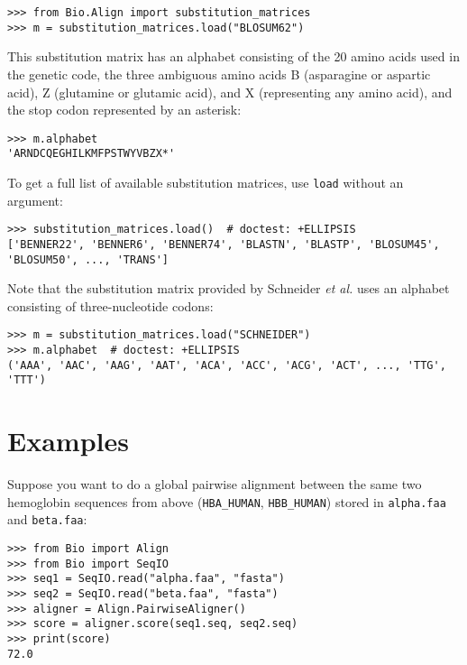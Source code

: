 \begin{verbatim}
>>> from Bio.Align import substitution_matrices
>>> m = substitution_matrices.load("BLOSUM62")
\end{verbatim}
This substitution matrix has an alphabet consisting of the 20 amino acids used in the genetic code, the three ambiguous amino acids B (asparagine or aspartic acid), Z (glutamine or glutamic acid), and X (representing any amino acid), and the stop codon represented by an asterisk:

\begin{verbatim}
>>> m.alphabet
'ARNDCQEGHILKMFPSTWYVBZX*'
\end{verbatim}

To get a full list of available substitution matrices, use \verb+load+ without an argument:

\begin{verbatim}
>>> substitution_matrices.load()  # doctest: +ELLIPSIS
['BENNER22', 'BENNER6', 'BENNER74', 'BLASTN', 'BLASTP', 'BLOSUM45', 'BLOSUM50', ..., 'TRANS']
\end{verbatim}

\hypertarget{codonmatrix}{
Note that the substitution matrix provided by Schneider \textit{et al.} \cite{schneider2005} uses an alphabet consisting of three-nucleotide codons:
}

\begin{verbatim}
>>> m = substitution_matrices.load("SCHNEIDER")
>>> m.alphabet  # doctest: +ELLIPSIS
('AAA', 'AAC', 'AAG', 'AAT', 'ACA', 'ACC', 'ACG', 'ACT', ..., 'TTG', 'TTT')
\end{verbatim}


\section{Examples}
\label{sec:pairwise-examples}

Suppose you want to do a global pairwise alignment between the same two
hemoglobin sequences from above (\texttt{HBA\_HUMAN}, \texttt{HBB\_HUMAN})
stored in \texttt{alpha.faa} and \texttt{beta.faa}:

\begin{verbatim}
>>> from Bio import Align
>>> from Bio import SeqIO
>>> seq1 = SeqIO.read("alpha.faa", "fasta")
>>> seq2 = SeqIO.read("beta.faa", "fasta")
>>> aligner = Align.PairwiseAligner()
>>> score = aligner.score(seq1.seq, seq2.seq)
>>> print(score)
72.0
\end{verbatim}

